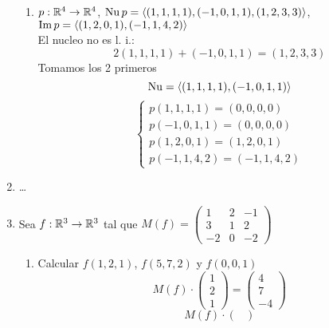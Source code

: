 \documentclass[../practica.root.tex]{subfiles}
\begin{document}
\begin{enumerate}
\begin{enumerate}
              \item \( p : \mathbb{R}^4 \to \mathbb{R}^4 \), \( \operatorname{Nu} p = \langle (1,1,1,1),(-1,0,1,1),(1,2,3,3) \rangle \), \( \operatorname{Im} p = \langle (1,2,0,1),(-1,1,4,2) \rangle \) \\
                    El nucleo no es l. i.:
                    \[ 2(1,1,1,1) + (-1,0,1,1) = (1,2,3,3) \]
                    Tomamos los 2 primeros
                    \[ \operatorname{Nu} = \langle (1,1,1,1),(-1,0,1,1) \rangle \]
                    \[
                        \boxed{
                            \begin{cases}
                                p(1,1,1,1) = (0,0,0,0)  \\
                                p(-1,0,1,1) = (0,0,0,0) \\
                                p(1,2,0,1) = (1,2,0,1)  \\
                                p(-1,1,4,2) = (-1,1,4,2)
                            \end{cases}
                        }
                    \]
          \end{enumerate}
    \item \dots
    \item Sea \( f : \mathbb{R}^3 \to \mathbb{R}^3 \) tal que \( M(f) = \begin{pmatrix}
              1  & 2 & -1 \\
              3  & 1 & 2  \\
              -2 & 0 & -2
          \end{pmatrix} \)
          \begin{enumerate}
              \item Calcular \( f(1,2,1) \), \( f(5,7,2) \) y \( f(0,0,1) \)
                    \[
                        M(f)\cdot
                        \begin{pmatrix}
                            1 \\ 2 \\ 1
                        \end{pmatrix}
                        =
                        \boxed{
                            \begin{pmatrix}
                                4 \\ 7 \\ -4
                            \end{pmatrix}
                        }
                    \] \[
                        M(f)\cdot
                        \begin{pmatrix}

\end{pmatrix}\]
\end{enumerate}
\end{enumerate}
\end{document}
